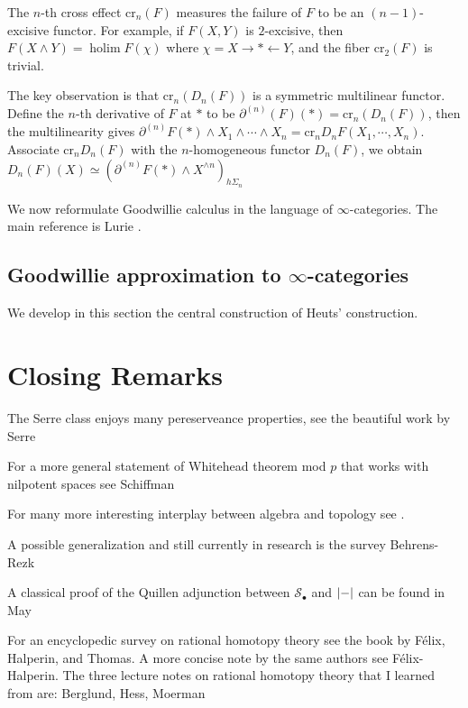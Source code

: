 \documentclass[psamsfonts]{amsart}
\theoremstyle{definition}
\theoremstyle{remark}
\newcommand{\cros}{\mathrm{cr}}
\DeclareMathOperator{\holim}{holim}
\numberwithin{equation}{section}
\begin{document}
The $n$-th cross effect $\cros_n(F)$ measures the failure of $F$ to be an $(n-1)$-excisive functor. For example, if $F(X,Y)$ is $2$-excisive, then $F(X\wedge Y)=\holim F(\chi)$ where $\chi=X\rightarrow\ast\leftarrow Y$, and the fiber $\cros_2(F)$ is trivial.

The key observation is that $\cros_n(D_n(F))$ is a symmetric multilinear functor. Define the $n$-th derivative of $F$ at $\ast$ to be $\partial^{(n)}(F)(\ast)=\cros_n(D_n(F))$, then the multilinearity gives $\partial^{(n)}F(\ast)\wedge X_1\wedge\cdots\wedge X_n=\cros_nD_nF(X_1,\cdots,X_n)$. Associate $\cros_nD_n(F)$ with the $n$-homogeneous functor $D_n(F)$, we obtain $D_n(F)(X)\simeq(\partial^{(n)}F(\ast)\wedge X^{\wedge n})_{h\Sigma_n}$

\medbreak
We now reformulate Goodwillie calculus in the language of $\infty$-categories. The main reference is Lurie \cite{Lurie}.

\subsection{Goodwillie approximation to $\infty$-categories} We develop in this section the central construction of Heuts' construction.

\newpage
\section{Closing Remarks}

The Serre class enjoys many pereserveance properties, see the beautiful work by Serre\cite{Serre}

For a more general statement of Whitehead theorem mod $p$ that works with nilpotent spaces see Schiffman\cite{Schiffman}

For many more interesting interplay between algebra and topology see \cite{Avramov}.

A possible generalization and still currently in research is the survey Behrens-Rezk \cite{Behrens-Rezk}

A classical proof of the Quillen adjunction between $\mathcal{S}_\bullet$ and $\abs{-}$ can be found in May\cite{May2}

For an encyclopedic survey on rational homotopy theory see the book by Félix, Halperin, and Thomas\cite{Felix}. A more concise note by the same authors see Félix-Halperin\cite{Felix-Halperin}. The three lecture notes on rational homotopy theory that I learned from are: Berglund\cite{Berglund}, Hess\cite{Hess}, Moerman\cite{Moerman}
\end{document}
